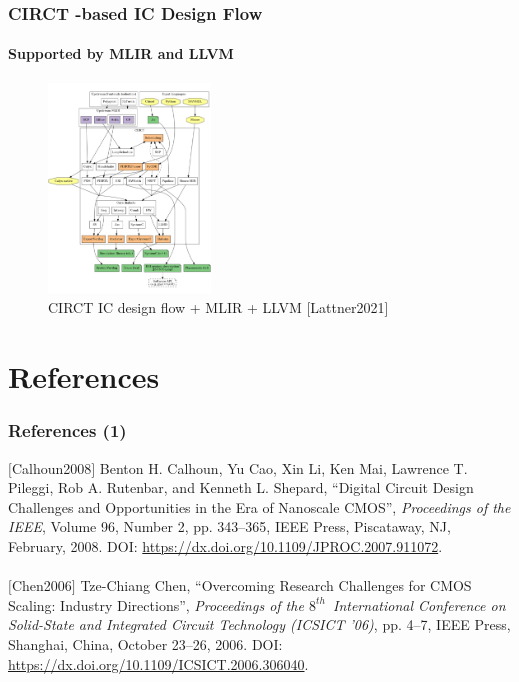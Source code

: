 \documentclass[xcolor={usenames,dvipsnames},hyperref={hyperindex,bookmarks}]{beamer}
\begin{document}
\begin{frame}
	\frametitle{CIRCT -based IC Design Flow}
	\framesubtitle{Supported by MLIR and LLVM}
	
	\begin{figure}
		\centering
		\includegraphics[height=2.2in]{./pics/CIRCTMLIR}
		\caption{CIRCT IC design flow + MLIR + LLVM [Lattner2021]}
	\end{figure}
\end{frame}





\section*{References}


\begin{frame}
	\frametitle{References (1)}
	
	$[$Calhoun2008$]$ Benton H. Calhoun, Yu Cao, Xin Li, Ken Mai, Lawrence T. Pileggi, Rob A. Rutenbar, and Kenneth L. Shepard, ``Digital Circuit Design Challenges and Opportunities in the Era of Nanoscale {CMOS}'', {\it Proceedings of the {IEEE}}, Volume 96, Number 2, pp. 343--365, {IEEE} Press, Piscataway, {NJ}, February, 2008. DOI: \url{https://dx.doi.org/10.1109/JPROC.2007.911072}. \\
	\ \\
	$[$Chen2006$]$ Tze-Chiang Chen, ``Overcoming Research Challenges for {CMOS} Scaling: Industry Directions'', {\it Proceedings of the $8^{th}$\ International Conference on Solid-State and Integrated Circuit Technology ({ICSICT '06})}, pp. 4--7, {IEEE} Press, Shanghai, China, October 23--26, 2006. DOI: \url{https://dx.doi.org/10.1109/ICSICT.2006.306040}. \\

\end{frame}
\end{document}
